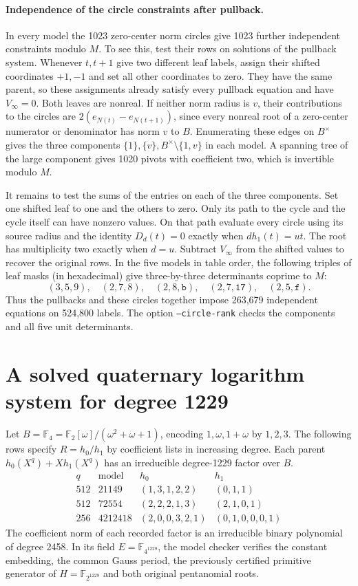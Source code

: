 \documentclass[11pt]{article}
\newcommand{\F}{\mathbb F_2}
\begin{document}
\paragraph{Independence of the circle constraints after pullback.}
In every model the 1023 zero-center norm circles give 1023 further
independent constraints modulo \(M\). To see this, test their rows
on solutions of the pullback system. Whenever \(t,t+1\) give two
different leaf labels, assign their shifted coordinates \(+1,-1\)
and set all other coordinates to zero. They have the same parent,
so these assignments already satisfy every pullback equation and
have \(V_\infty=0\). Both leaves are nonreal. If neither norm
radius is \(v\), their contributions to the circles are
\(2(e_{N(t)}-e_{N(t+1)})\), since every nonreal root of a
zero-center numerator or denominator has norm \(v\) to \(B\).
Enumerating these edges on \(B^\times\) gives the three components
\(\{1\},\{v\},B^\times\setminus\{1,v\}\) in each model.
A spanning tree of the large component gives 1020 pivots with
coefficient two, which is invertible modulo \(M\).

It remains to test the sums of the entries on each of the three
components. Set one shifted leaf to one and the others to zero.
Only its path to the cycle and the cycle itself can have nonzero
values. On that path evaluate every circle using its source radius
and the identity \(D_d(t)=0\) exactly when \(d h_1(t)=ut\).
The root has multiplicity two exactly when \(d=u\). Subtract
\(V_\infty\) from the shifted values to recover the original rows.
In the five models in table order, the following triples of leaf
masks (in hexadecimal) give three-by-three determinants coprime to \(M\):
\[
 (3,5,9),\quad(2,7,8),\quad(2,8,\mathtt b),\quad
 (2,7,\mathtt{17}),\quad(2,5,\mathtt f).
\]
Thus the pullbacks and these circles together impose 263,679 independent
equations on 524,800 labels. The option \texttt{--circle-rank} checks
the components and all five unit determinants.

\section{A solved quaternary logarithm system for degree 1229}
\label{sec:quaternary-logs}
Let \(B=\mathbb F_4=\F[\omega]/(\omega^2+\omega+1)\), encoding
\(1,\omega,1+\omega\) by \(1,2,3\). The following rows specify
\(R=h_0/h_1\) by coefficient lists in increasing degree. Each parent
\(h_0(X^q)+Xh_1(X^q)\) has an irreducible degree-1229 factor over \(B\).
\[
\begin{array}{r|r|l|l}
 q&\text{model}& h_0&h_1\\\hline
512&21149&(1,3,1,2,2)&(0,1,1)\\
512&72554&(2,2,2,1,3)&(2,1,0,1)\\
256&4212418&(2,0,0,3,2,1)&(0,1,0,0,0,1)
\end{array}
\]
The coefficient norm of each recorded factor is an irreducible binary
polynomial of degree 2458. In its field \(E=\mathbb F_{4^{1229}}\),
the model checker verifies the constant embedding, the common Gauss
period, the previously certified primitive generator of
\(H=\mathbb F_{2^{1229}}\) and both original pentanomial roots.
\end{document}
